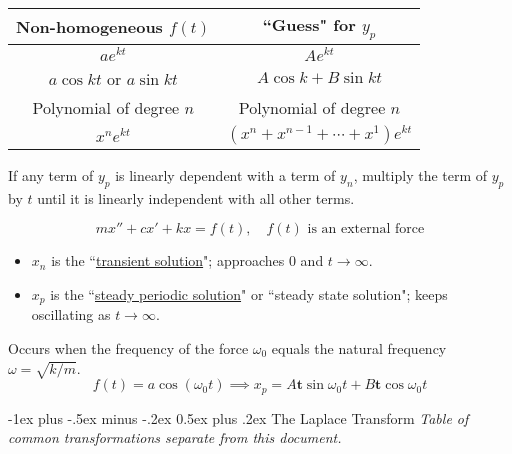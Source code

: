 \documentclass[10pt,landscape,letterpaper]{article}
\makeatletter
\renewcommand{\section}{\@startsection{section}{1}{0mm}%
                                {-1ex plus -.5ex minus -.2ex}%
                                {0.5ex plus .2ex}%
                                {\normalfont\large\bfseries}}
\newcommand\cheatsheetmargin{0.2cm}
\makeatother
\begin{document}
\begin{multicols}{3}
\begin{minipage}{\columnwidth}
\begin{description}[style=unboxed,leftmargin=\cheatsheetmargin]
    \renewcommand{\arraystretch}{1.2}
    \item \begin{tabular}{|c|c|}
        \hline
        \textbf{Non-homogeneous $f(t)$} & \textbf{``Guess" for $y_p$} \\
        \hline
        $ae^{kt}$ & $Ae^{kt}$ \\
        $a\cos k t$ or $a\sin k t$ &  $A\cos k + B\sin k t$ \\
        Polynomial of degree $n$ & Polynomial of degree $n$ \\
        $x^ne^{kt}$ & $(x^n + x^{n-1} +\cdots+ x^1)e^{kt}$ \\
        \hline
    \end{tabular}
    \item[Important:]
        If any term of $y_p$ is linearly dependent with a term of $y_n$, multiply the term of $y_p$ by $t$ until it is linearly independent with all other terms.
   \item[Forced Mechanical Vibrations]
   \begin{equation*}
   mx'' + cx' + kx = f(t), \quad f(t) \text{ is an external force}
   \end{equation*}
   \begin{itemize}
       \item$x_n$ is the ``\underline{transient solution}"; approaches 0 and $t \to \infty$.
       \item$x_p$ is the ``\underline{steady periodic solution}" or ``steady state solution"; keeps oscillating as $t\to \infty$.
   \end{itemize}
    \item[Resonance] Occurs when the frequency of the force $\omega_0$ equals the natural frequency $\omega = \sqrt{k/m}$.
    \begin{equation*}
        f(t) = a\cos\left( \omega_0 t\right) \implies x_p = A\mathbf{t}\sin \omega_0 t + B\mathbf{t}\cos \omega_0 t
    \end{equation*}
\end{description}


\section{The Laplace Transform}
\textit{\scriptsize * Table of common transformations separate from this document.}


\end{minipage}
\end{multicols}
\end{document}
